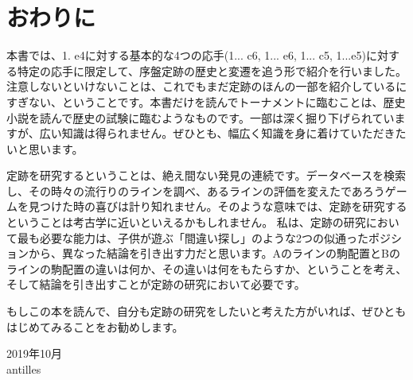 \section{おわりに}

本書では、1. e4に対する基本的な4つの応手(1... c6, 1... e6, 1... c5, 1...e5)に対する特定の応手に限定して、序盤定跡の歴史と変遷を追う形で紹介を行いました。
注意しないといけないことは、これでもまだ定跡のほんの一部を紹介しているにすぎない、ということです。本書だけを読んでトーナメントに臨むことは、歴史小説を読んで歴史の試験に臨むようなものです。一部は深く掘り下げられていますが、広い知識は得られません。ぜひとも、幅広く知識を身に着けていただきたいと思います。

定跡を研究するということは、絶え間ない発見の連続です。データベースを検索し、その時々の流行りのラインを調べ、あるラインの評価を変えたであろうゲームを見つけた時の喜びは計り知れません。そのような意味では、定跡を研究するということは考古学に近いといえるかもしれません。
私は、定跡の研究において最も必要な能力は、子供が遊ぶ「間違い探し」のような2つの似通ったポジションから、異なった結論を引き出す力だと思います。Aのラインの駒配置とBのラインの駒配置の違いは何か、その違いは何をもたらすか、ということを考え、そして結論を引き出すことが定跡の研究において必要です。

もしこの本を読んで、自分も定跡の研究をしたいと考えた方がいれば、ぜひともはじめてみることをお勧めします。

\begin{flushright}
2019年10月\\
antilles
\end{flushright}
